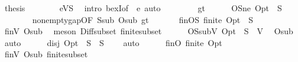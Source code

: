 \begin{isabellebody}
\ {\isacharquery}{\kern0pt}thesis\isanewline
\ \ \ \ \ \ \isamarkupfalse%
\ eVS\ \isamarkupfalse%
\ {\isacharparenleft}{\kern0pt}intro\ bexI{\isacharbrackleft}{\kern0pt}of\ {\isacharunderscore}{\kern0pt}\ e{\isacharbrackright}{\kern0pt}{\isacharparenright}{\kern0pt}\ auto\isanewline
\ \ \isamarkupfalse%
\isanewline
\ \ \ \ \isamarkupfalse%
\ gt\isanewline
\ \ \ \ \isamarkupfalse%
\ OS{\isacharunderscore}{\kern0pt}ne{\isacharcolon}{\kern0pt}\ {\isachardoublequoteopen}Opt\ {\isacharminus}{\kern0pt}\ S\ {\isasymnoteq}\ {\isacharbraceleft}{\kern0pt}{\isacharbraceright}{\kern0pt}{\isachardoublequoteclose}\isanewline
\ \ \ \ \ \ \isamarkupfalse%
\ nonempty{\isacharunderscore}{\kern0pt}gap{\isacharbrackleft}{\kern0pt}OF\ S{\isacharunderscore}{\kern0pt}sub\ O{\isacharunderscore}{\kern0pt}sub\ gt{\isacharbrackright}{\kern0pt}\ \isakeywordONE{{\isachardot}{\kern0pt}}\isamarkupfalse%
\isanewline
\isanewline
\ \ \ \ \isamarkupfalse%
\ finOS{\isacharcolon}{\kern0pt}\ {\isachardoublequoteopen}finite\ {\isacharparenleft}{\kern0pt}Opt\ {\isacharminus}{\kern0pt}\ S{\isacharparenright}{\kern0pt}{\isachardoublequoteclose}\isanewline
\ \ \ \ \ \ \isamarkupfalse%
\ finV\ O{\isacharunderscore}{\kern0pt}sub\ \isamarkupfalse%
\ {\isacharparenleft}{\kern0pt}meson\ Diff{\isacharunderscore}{\kern0pt}subset\ finite{\isacharunderscore}{\kern0pt}subset{\isacharparenright}{\kern0pt}\isanewline
\ \ \ \ \isamarkupfalse%
\ OS{\isacharunderscore}{\kern0pt}subV{\isacharcolon}{\kern0pt}\ {\isachardoublequoteopen}Opt\ {\isacharminus}{\kern0pt}\ S\ {\isasymsubseteq}\ V{\isachardoublequoteclose}\ \isamarkupfalse%
\ O{\isacharunderscore}{\kern0pt}sub\ \isamarkupfalse%
\ auto\isanewline
\ \ \ \ \isamarkupfalse%
\ disj{\isacharcolon}{\kern0pt}\ {\isachardoublequoteopen}{\isacharparenleft}{\kern0pt}Opt\ {\isacharminus}{\kern0pt}\ S{\isacharparenright}{\kern0pt}\ {\isasyminter}\ S\ {\isacharequal}{\kern0pt}\ {\isacharbraceleft}{\kern0pt}{\isacharbraceright}{\kern0pt}{\isachardoublequoteclose}\ \isamarkupfalse%
\ auto\isanewline
\ \ \ \ \isamarkupfalse%
\ finO{\isacharcolon}{\kern0pt}\ {\isachardoublequoteopen}finite\ Opt{\isachardoublequoteclose}\ \isamarkupfalse%
\ finV\ O{\isacharunderscore}{\kern0pt}sub\ finite{\isacharunderscore}{\kern0pt}subset\ \isamarkupfalse%

\end{isabellebody}
